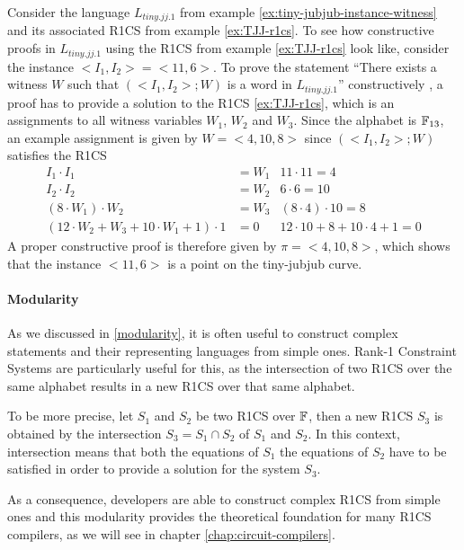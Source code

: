 \begin{example}\label{ex:tiny-jubjub-r1cs} Consider the language $L_{tiny.jj.1}$ from example \ref{ex:tiny-jubjub-instance-witness} and its associated R1CS from example \ref{ex:TJJ-r1cs}. To see how constructive proofs in $L_{tiny.jj.1}$ using the R1CS from example \ref{ex:TJJ-r1cs} look like, consider the instance $<I_1,I_2>= <11,6>$. To prove the statement ``There exists a witness $W$ such that $(<I_1,I_2>;W)$ is a word in $L_{tiny.jj.1}$'' constructively , a proof has to provide a solution to the R1CS \ref{ex:TJJ-r1cs}, which is an assignments to all witness variables $W_1$, $W_2$ and $W_3$. Since the alphabet is $\mathbb{F}_{13}$, an example assignment is given by
$W=<4,10,8>$ since $(<I_1,I_2>;W)$ satisfies the R1CS
\begin{align*}
I_1 \cdot I_1 & = W_1 & 11\cdot 11 = 4\\
I_2 \cdot I_2 & = W_2 & 6 \cdot 6 = 10 \\
(8 \cdot W_1) \cdot W_2 & = W_3 & (8\cdot 4)\cdot 10 = 8\\
(12\cdot W_2 + W_3 + 10\cdot W_1 + 1)\cdot 1 & = 0 & 12\cdot 10 + 8 + 10\cdot 4 + 1 = 0
\end{align*}
A proper constructive proof is therefore given by $\pi=<4,10,8>$, which shows that the instance $<11,6>$ is a point on the tiny-jubjub curve. 
\end{example}
\paragraph{Modularity}
\label{sec:R1CS_modularity} As we discussed in \ref{modularity}, it is often useful to construct complex statements and their representing languages from simple ones. Rank-1 Constraint Systems are particularly useful for this, as the intersection of two R1CS over the same alphabet results in a new R1CS over that same alphabet. 

To be more precise, let $S_1$ and $S_2$ be two R1CS over $\mathbb{F}$, then a new R1CS $S_3$ is obtained by the intersection $S_3 = S_1\cap S_2$  of $S_1$ and $S_2$. In this context, intersection means that both the equations of $S_1$  the equations of $S_2$ have to be satisfied in order to provide a solution for the system $S_3$.

As a consequence, developers are able to construct complex R1CS from simple ones and this modularity provides the theoretical foundation for many R1CS compilers, as we will see in chapter \ref{chap:circuit-compilers}.

